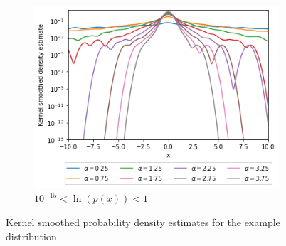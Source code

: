 \documentclass[a4paper]{article}
\begin{document}
\begin{figure}[h]
\begin{subfigure}[b]{0.3\textwidth}
    \end{subfigure}
    \hfill
    \begin{subfigure}[b]{0.3\textwidth}
        \centering
        \includegraphics[width=\textwidth]{figures/nonstandard_distribution_ksdensity_log_far.png}
        \caption{$10^{-15} < \ln(p(x)) < 1$}
        \label{fig:nonstandard_distribution_ksdensity_log_far}
    \end{subfigure}
    \caption{Kernel smoothed probability density estimates for the example distribution}
    \label{fig:nonstandard_distribution_kernel_smoothed}
\end{figure}


\newpage
%
\end{document}
